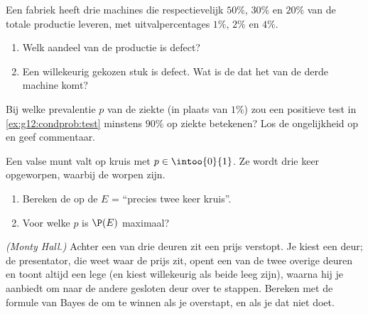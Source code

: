 \begin{exercise}[$\star\star$]\label{exo:g12:condprob:4}
Een fabriek heeft drie machines die respectievelijk $50\%$, $30\%$ en $20\%$
van de totale productie leveren, met uitvalpercentages $1\%$, $2\%$ en $4\%$.
\begin{enumerate}
  \item Welk aandeel van de productie is defect?
  \item Een willekeurig gekozen stuk is defect. Wat is de  dat het van de
        derde machine komt?
\end{enumerate}
\end{exercise}

\begin{exercise}[$\star\star$]\label{exo:g12:condprob:5}
Bij welke prevalentie $p$ van de ziekte (in plaats van $1\%$) zou een
positieve test in \cref{ex:g12:condprob:test} minstens $90\%$  op ziekte
betekenen? Los de ongelijkheid op en geef commentaar.
\end{exercise}

\begin{exercise}[$\star\star$]\label{exo:g12:condprob:6}
Een valse munt valt op kruis met  $p \in \intoo{0}{1}$. Ze wordt drie keer
opgeworpen, waarbij de worpen  zijn.
\begin{enumerate}
  \item Bereken de  op de  $E$ = ``precies twee keer kruis''.
  \item Voor welke $p$ is $\P(E)$ maximaal?
\end{enumerate}
\end{exercise}

\begin{exercise}[$\star\star\star$]\label{exo:g12:condprob:7}
\emph{(Monty Hall.)} Achter een van drie deuren zit een prijs verstopt. Je
kiest een deur; de presentator, die weet waar de prijs zit, opent een van de
twee overige deuren en toont altijd een lege (en kiest willekeurig als beide
leeg zijn), waarna hij je aanbiedt om naar de andere gesloten deur over te
stappen. Bereken met de formule van Bayes de  om te winnen als je
overstapt, en als je dat niet doet.
\end{exercise}


